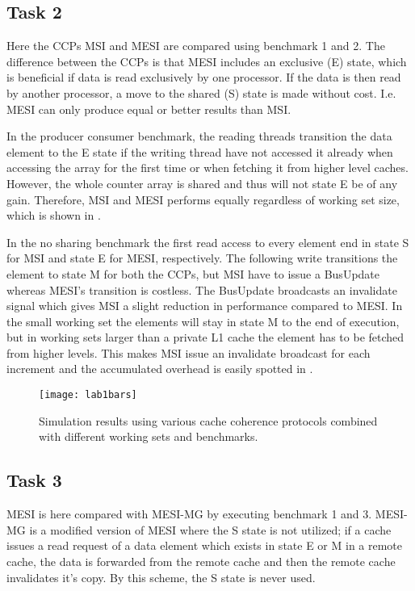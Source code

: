 \subsection{Task 2}
\label{sec:lab12}
Here the CCPs MSI and MESI are compared using benchmark 1 and 2. The difference between the CCPs is that MESI includes an exclusive (E) state, which is beneficial if data is read exclusively by one processor. If the data is then read by another processor, a move to the shared (S) state is made without cost. I.e. MESI can only produce equal or better results than MSI.

In the producer consumer benchmark, the reading threads transition the data element to the E state if the writing thread have not accessed it already when accessing the array for the first time or when fetching it from higher level caches. However, the whole counter array is shared and thus will not state E be of any gain. Therefore, MSI and MESI performs equally regardless of working set size, which is shown in .

In the no sharing benchmark the first read access to every element end in state S for MSI and state E for MESI, respectively. The following write transitions the element to state M for both the CCPs, but MSI have to issue a BusUpdate whereas MESI's transition is costless. The BusUpdate broadcasts an invalidate signal which gives MSI a slight reduction in performance compared to MESI. In the small working set the elements will stay in state M to the end of execution, but in working sets larger than a private L1 cache the element has to be fetched from higher levels. This makes MSI issue an invalidate broadcast for each increment and the accumulated overhead is easily spotted in . 

\begin{figure}[t]
	\center
	\texttt{[image: lab1bars]}
	\caption{Simulation results using various cache coherence protocols combined with different working sets and benchmarks.}
	\label{fig:lab1bars}
\end{figure}

\subsection{Task 3}
\label{sec:lab13}
MESI is here compared with MESI-MG by executing benchmark 1 and 3. MESI-MG is a modified version of MESI where the S state is not utilized; if a cache issues a read request of a data element which exists in state E or M in a remote cache, the data is forwarded from the remote cache and then the remote cache invalidates it's copy. By this scheme, the S state is never used.

